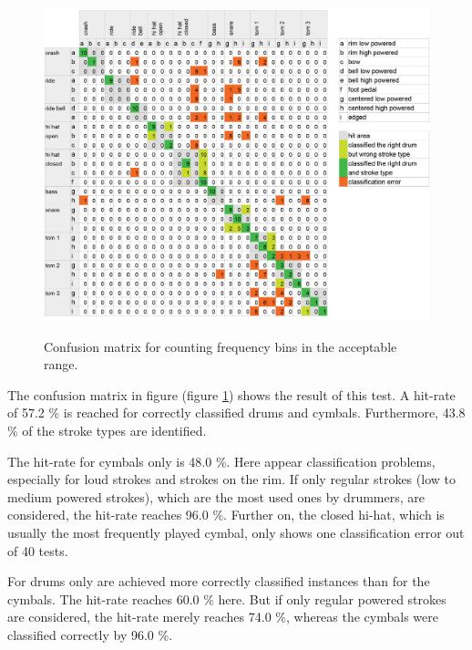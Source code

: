 
\begin{figure}[htb]
	\centering
	\includegraphics[width=\textwidth]{images/classification_matrix/matrix_test_1.png}
	\label{}
	\caption{Confusion matrix for counting frequency bins in the acceptable range.}
	\label{fig:matrix1}
\end{figure}

The confusion matrix in figure (figure \ref{fig:matrix1}) shows the  result of this test. A hit-rate of 57.2 \% is reached for correctly classified drums and cymbals. Furthermore, 43.8 \% of the stroke types are identified.

The hit-rate for cymbals only is 48.0 \%. Here appear classification problems, especially for loud strokes and strokes on the rim. If only regular strokes (low to medium powered strokes), which are the most used ones by drummers, are considered, the hit-rate reaches 96.0 \%. Further on, the closed hi-hat, which is usually the most frequently played cymbal, only shows one classification error out of 40 tests.

For drums only are achieved more correctly classified instances than for the cymbals. The hit-rate reaches 60.0 \% here. But if only regular powered strokes are considered, the hit-rate merely reaches 74.0 \%, whereas the cymbals were classified correctly by 96.0 \%.


